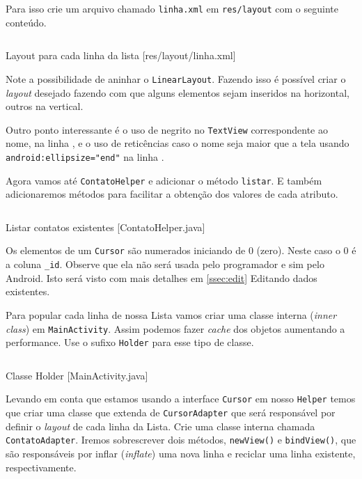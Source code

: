 Para isso crie um arquivo chamado \texttt{linha.xml} em
\texttt{res/layout} com o seguinte conteúdo.

\begin{listing}[H]
  \inputminted[linenos=true,frame=bottomline,tabsize=3]{ xml }{ source/linha-1.xml }
  \caption{Layout para cada linha da lista [res/layout/linha.xml]}
\end{listing}

Note a possibilidade de aninhar o \texttt{LinearLayout}. Fazendo isso é
possível criar o \emph{layout} desejado fazendo com que alguns elementos
sejam inseridos na horizontal, outros na vertical.

Outro ponto interessante é o uso de negrito no \texttt{TextView}
correspondente ao nome, na linha , e o uso de reticências
caso o nome seja maior que a tela usando
\texttt{android:ellipsize="end"} na linha .

Agora vamos até \texttt{ContatoHelper} e adicionar o método
\texttt{listar}. E também adicionaremos métodos para facilitar a
obtenção dos valores de cada atributo.

\begin{listing}[H]
  \inputminted[linenos=true,frame=bottomline,tabsize=3]{ java }{ source/ContatoHelper-3.java }
  \caption{Listar contatos existentes [ContatoHelper.java]}
\end{listing}

Os elementos de um \texttt{Cursor} são numerados iniciando de 0 (zero).
Neste caso o 0 é a coluna \texttt{\_id}. Observe que ela não será usada
pelo programador e sim pelo Android. Isto será visto com mais detalhes
em \ref{ssec:edit} Editando dados existentes.

Para popular cada linha de nossa Lista vamos criar uma classe interna
(\emph{inner class}) em \texttt{MainActivity}. Assim podemos fazer
\emph{cache} dos objetos aumentando a performance. Use o sufixo
\texttt{Holder} para esse tipo de classe.

\begin{listing}[H]
  \inputminted[linenos=true,frame=bottomline,tabsize=3]{ java }{ source/MainActivity-4.java }
  \caption{Classe Holder [MainActivity.java]}
\end{listing}

Levando em conta que estamos usando a interface \texttt{Cursor} em nosso
\texttt{Helper} temos que criar uma classe que extenda de
\texttt{CursorAdapter} que será responsável por definir o \emph{layout}
de cada linha da Lista. Crie uma classe interna chamada
\texttt{ContatoAdapter}. Iremos sobrescrever dois métodos,
\texttt{newView()} e \texttt{bindView()}, que são responsáveis por
inflar (\emph{inflate}) uma nova linha e reciclar uma linha existente,
respectivamente.

